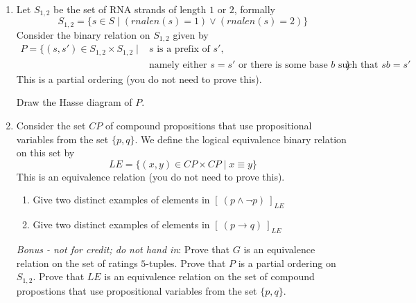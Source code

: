 \documentclass[12pt, oneside]{article}
\begin{document}
\begin{enumerate}
\begin{enumerate}
    Recall that the {\bf equivalence class} of an element $x \in X$ for an equivalence relation $\sim$ on the set $X$ 
    is the set $\{s \in X | (x, s) \in \sim \}$. We write this as $[x]_\sim$.
    
    \begin{enumerate}
        \item Find a ratings $5$-tuple $v$ such that $[v]_{G} = \{v \}$.
        \item Find distinct ratings $5$-tuples $u_1, u_2$ ($u_1 \neq u_2$) whose equivalence classes $[u_1]_{G}$ and $[u_2]_{G}$ have the same size.
        \item Find distinct ratings $5$-tuples $w_1, w_2$ ($w_1 \neq w_2$) whose equivalence classes $[w_1]_{G}$ and $[w_2]_{G}$ have different sizes.
    \end{enumerate}

    \item Let $S_{1,2}$ be the set of RNA strands of length $1$ or $2$, formally 
        \[
            S_{1,2} = \{ s \in S \mid ( rnalen(s) = 1) \lor (rnalen(s) = 2)\}
        \]
    Consider the binary relation on $S_{1,2}$ given by
    \begin{align*}
        P = \{ (s, s') \in S_{1,2} \times S_{1,2} \mid &\text{$s$ is a prefix of $s'$, }\\
        &\text{namely either $s = s'$ or there is 
        some base $b$ such that $sb=s'$} \}
    \end{align*}
    This is a partial ordering (you do not need to prove this).

    Draw the Hasse diagram of $P$.

    \item Consider the set $CP$ of compound propositions that use propositional variables from the set $\{p,q\}$.
    We define the logical equivalence binary relation on this set by 
    \[
        LE = \{ (x, y) \in CP \times CP \mid x \equiv y \}
    \]
    This is an equivalence relation (you do not need to prove this).

    \begin{enumerate}
        \item Give two distinct examples of elements in $[~(p \land \lnot p)~]_{LE}$
        \item Give two distinct examples of elements in $[~(p \to q)~]_{LE}$
    \end{enumerate}

    {\it Bonus - not for credit; do not hand in}: 
    Prove that $G$ is an equivalence relation on
    the set of ratings $5$-tuples.
    Prove that $P$ is a partial ordering on $S_{1,2}$.
    Prove that $LE$ is an equivalence relation on 
    the set of compound propostions that use propositional variables from 
    the set $\{p,q\}$.




\end{enumerate}
\end{enumerate}
\end{document}
